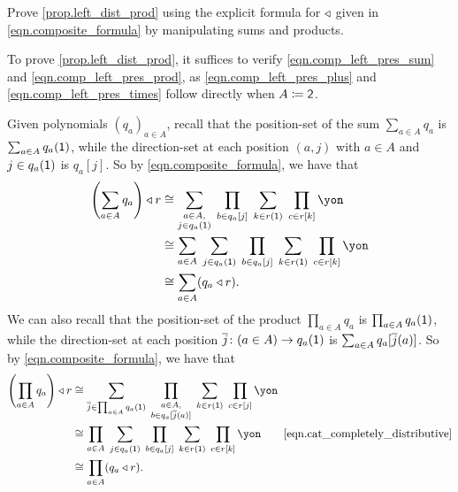 \documentclass[Book-Poly]{subfiles}
\begin{document}
\begin{exercise}\label{exc.left_dist}
Prove \cref{prop.left_dist_prod} using the explicit formula for $\mathbin{\triangleleft}$ given in \eqref{eqn.composite_formula} by manipulating sums and products.
\begin{solution}
To prove \cref{prop.left_dist_prod}, it suffices to verify \eqref{eqn.comp_left_pres_sum} and \eqref{eqn.comp_left_pres_prod}, as \eqref{eqn.comp_left_pres_plus} and \eqref{eqn.comp_left_pres_times} follow directly when $A\coloneqq\textsf{2}$.

Given polynomials $(q_a)_{a\in A}$, recall that the position-set of the sum $\sum_{a\in A}q_a$ is $\sum_{a\in A}q_a(\textsf{1})$, while the direction-set at each position $(a,j)$ with $a\in A$ and $j\in q_a(\textsf{1})$ is $q_a[j]$.
So by \eqref{eqn.composite_formula}, we have that
\begin{align*}
    \left(\sum_{a\in A}q_a\right)\tri r &\iso \sum_{\substack{a\in A, \\ j\in q_a(\1)}}\;\prod_{b \in q_a[j]}\;\sum_{k \in r(\1)}\;\prod_{c \in r[k]}\yon \\
    &\iso \sum_{a\in A}\;\sum_{j\in q_a(\1)}\;\prod_{b \in q_a[j]}\;\sum_{k \in r(\1)}\;\prod_{c \in r[k]}\yon \\
    &\iso\sum_{a\in A}(q_a\tri r).
\end{align*}
We can also recall that the position-set of the product $\prod_{a\in A}q_a$ is $\prod_{a\in A}q_a(\textsf{1})$, while the direction-set at each position $\overline{j}\colon(a\in A)\to q_a(\textsf{1})$ is $\sum_{a\in A}q_a[\overline{j}(a)]$.
So by \eqref{eqn.composite_formula}, we have that
\begin{align*}
    \left(\prod_{a\in A}q_a\right)\tri r &\iso \sum_{\ol{j}\in\prod_{a\in A}q_a(\1)} \; \prod_{\substack{a\in A, \\ b\in q_a[\ol{j}(a)]}} \; \sum_{k \in r(\1)} \; \prod_{c \in r[j]} \yon \\
    &\iso \prod_{a\in A} \; \sum_{j\in q_a(\1)} \; \prod_{b\in q_a[j]} \; \sum_{k \in r(\1)} \; \prod_{c \in r[k]} \yon \tag*{\eqref{eqn.cat_completely_distributive}} \\
    &\iso\prod_{a\in A}(q_a\tri r).
\end{align*}
\end{solution}
\end{exercise}
\end{document}
